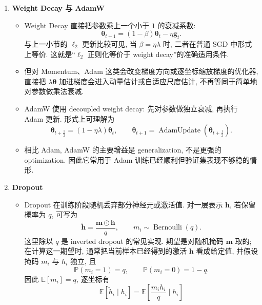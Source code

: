 \documentclass{../nndlcourse}
\begin{document}
\begin{enumerate}
\begin{itemize}
\[        =
        \boldsymbol{\theta}_t
        - \eta(\boldsymbol{g}_t+\lambda\boldsymbol{\theta}_t)
        =
        (1-\eta\lambda)\boldsymbol{\theta}_t-\eta\boldsymbol{g}_t.
      \]
      上式说明, 在普通 SGD 中 $\ell_2$ 正则化等价于每次更新时把权重向零收缩一点, 这就是 weight decay 的直观来源.
    \end{itemize}
  \item \textbf{Weight Decay 与 AdamW}
    \begin{itemize}
      \item Weight Decay 直接把参数乘上一个小于 $1$ 的衰减系数:
      \[
        \boldsymbol{\theta}_{t+1}
        =
        (1-\beta)\boldsymbol{\theta}_t
        -
        \eta\boldsymbol{g}_t.
      \]
      与上一小节的 $\ell_2$ 更新比较可见, 当 $\beta=\eta\lambda$ 时, 二者在普通 SGD 中形式上等价. 这就是“$\ell_2$ 正则化等价于 weight decay”的准确适用条件.
      \item 但对 Momentum、Adam 这类会改变梯度方向或逐坐标缩放梯度的优化器, 直接把 $\lambda\boldsymbol{\theta}$ 加进梯度会进入动量估计或自适应尺度估计, 不再等同于简单地对参数做乘法衰减.
      \item AdamW 使用 decoupled weight decay: 先对参数做独立衰减, 再执行 Adam 更新. 形式上可理解为
      \[
        \boldsymbol{\theta}_{t+\frac{1}{2}}
        =
        (1-\eta\lambda)\boldsymbol{\theta}_t,
        \qquad
        \boldsymbol{\theta}_{t+1}
        =
        \operatorname{AdamUpdate}(\boldsymbol{\theta}_{t+\frac{1}{2}}).
      \]
      \item 相比 Adam, AdamW 的主要增益是 generalization, 不是更强的 optimization. 因此它常用于 Adam 训练已经顺利但验证集表现不够稳的情形.
    \end{itemize}
  \item \textbf{Dropout}
    \begin{itemize}
      \item Dropout 在训练阶段随机丢弃部分神经元或激活值. 对一层表示 $\boldsymbol{h}$, 若保留概率为 $q$, 可写为
      \[
        \tilde{\boldsymbol{h}}
        =
        \frac{\boldsymbol{m}\odot \boldsymbol{h}}{q},
        \qquad
        m_i \sim \operatorname{Bernoulli}(q).
      \]
      这里除以 $q$ 是 inverted dropout 的常见实现. 期望是对随机掩码 $\boldsymbol{m}$ 取的; 在计算这一期望时, 通常把当前样本已经得到的激活 $\boldsymbol{h}$ 看成给定值, 并假设掩码 $m_i$ 与 $h_i$ 独立, 且
      \[
        \mathbb{P}(m_i=1)=q,
        \qquad
        \mathbb{P}(m_i=0)=1-q.
      \]
      因此 $\mathbb{E}[m_i]=q$, 逐坐标有
      \[
        \mathbb{E}[\tilde{h}_i\mid h_i]
        =
        \mathbb{E}\left[\frac{m_i h_i}{q}\mid h_i\right]
\]
\end{itemize}
\end{enumerate}
\end{document}
